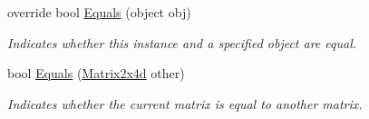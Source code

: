 \begin{DoxyCompactItemize}
override bool \hyperlink{struct_open_t_k_1_1_matrix2x4d_aa677af5966068019e9d0c344671b9fb4}{Equals} (object obj)
\begin{DoxyCompactList}\small\item\em Indicates whether this instance and a specified object are equal. \end{DoxyCompactList}\item 
bool \hyperlink{struct_open_t_k_1_1_matrix2x4d_a65019f5e1297414b4242f346ac43ff32}{Equals} (\hyperlink{struct_open_t_k_1_1_matrix2x4d}{Matrix2x4d} other)
\begin{DoxyCompactList}\small\item\em Indicates whether the current matrix is equal to another matrix. \end{DoxyCompactList}\end{DoxyCompactItemize}
